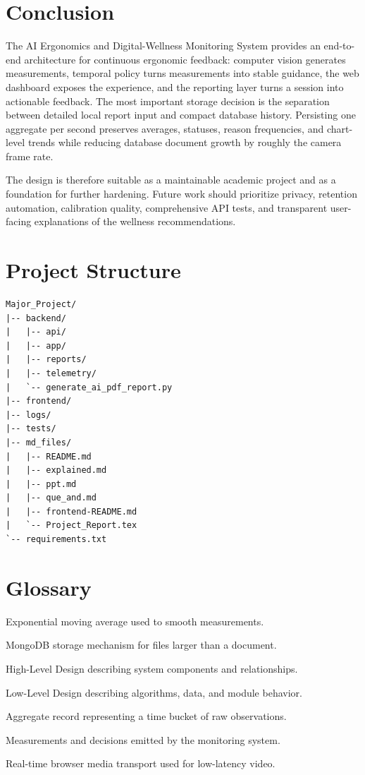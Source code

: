 \documentclass[12pt,a4paper]{report}
\newcommand{\systemname}{AI Ergonomics and Digital-Wellness Monitoring System}
\begin{document}
\chapter{Conclusion}
The \systemname{} provides an end-to-end architecture for continuous
ergonomic feedback: computer vision generates measurements, temporal policy
turns measurements into stable guidance, the web dashboard exposes the
experience, and the reporting layer turns a session into actionable feedback.
The most important storage decision is the separation between detailed local
report input and compact database history. Persisting one aggregate per second
preserves averages, statuses, reason frequencies, and chart-level trends while
reducing database document growth by roughly the camera frame rate.

The design is therefore suitable as a maintainable academic project and as a
foundation for further hardening. Future work should prioritize privacy,
retention automation, calibration quality, comprehensive API tests, and
transparent user-facing explanations of the wellness recommendations.

\appendix
\chapter{Project Structure}
\begin{lstlisting}[language={}]
Major_Project/
|-- backend/
|   |-- api/
|   |-- app/
|   |-- reports/
|   |-- telemetry/
|   `-- generate_ai_pdf_report.py
|-- frontend/
|-- logs/
|-- tests/
|-- md_files/
|   |-- README.md
|   |-- explained.md
|   |-- ppt.md
|   |-- que_and.md
|   |-- frontend-README.md
|   `-- Project_Report.tex
`-- requirements.txt
\end{lstlisting}

\chapter{Glossary}
\begin{description}[style=nextline]
\item[EMA] Exponential moving average used to smooth measurements.
\item[GridFS] MongoDB storage mechanism for files larger than a document.
\item[HLD] High-Level Design describing system components and relationships.
\item[LLD] Low-Level Design describing algorithms, data, and module behavior.
\item[Rollup] Aggregate record representing a time bucket of raw observations.
\item[Telemetry] Measurements and decisions emitted by the monitoring system.
\item[WebRTC] Real-time browser media transport used for low-latency video.
\end{description}
\end{document}

